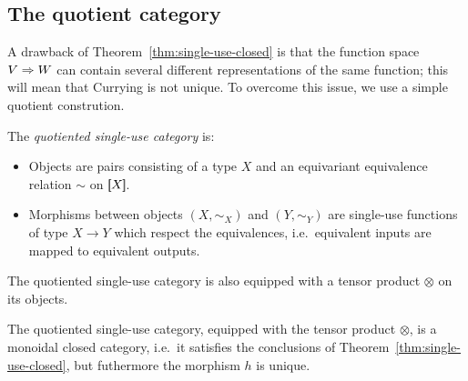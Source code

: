 \subsection{The quotient category}
\label{sec:quotient-category}
A drawback of Theorem~\ref{thm:single-use-closed} is that the function space $V \Rightarrow W$ can contain several different representations of the same function; this will mean that Currying is not unique. To overcome this issue, we use a simple quotient constrution. 




\begin{definition}
    The \emph{quotiented single-use category} is: 
    \begin{itemize}
    \item Objects are pairs consisting of a type $X$ and an equivariant  equivalence relation $\sim$ on $[\!\![X]\!\!]$.
    \item Morphisms between objects $(X,\sim_X)$ and $(Y,\sim_Y)$ are single-use functions of type $X \to Y$  which respect the equivalences, i.e.~equivalent inputs are mapped to equivalent outputs.
    \end{itemize}
\end{definition}

The quotiented single-use category is also equipped with a tensor product $\otimes$ on its objects.
\begin{theorem}
    The quotiented single-use category, equipped with the tensor product $\otimes$, is a monoidal closed category, i.e.~it satisfies the conclusions of Theorem~\ref{thm:single-use-closed}, but futhermore the morphism $h$ is unique.
\end{theorem}

